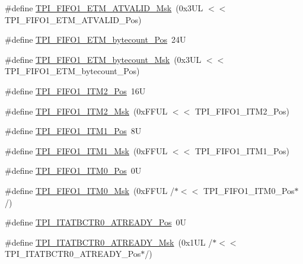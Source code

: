 \begin{DoxyCompactItemize}
\item 
\#define \hyperlink{group___c_m_s_i_s___t_p_i_ga0e8f29a1e9378d1ceb0708035edbb86d}{T\+P\+I\+\_\+\+F\+I\+F\+O1\+\_\+\+E\+T\+M\+\_\+\+A\+T\+V\+A\+L\+I\+D\+\_\+\+Msk}~(0x3\+U\+L $<$$<$ T\+P\+I\+\_\+\+F\+I\+F\+O1\+\_\+\+E\+T\+M\+\_\+\+A\+T\+V\+A\+L\+I\+D\+\_\+\+Pos)
\item 
\#define \hyperlink{group___c_m_s_i_s___t_p_i_gaab31238152b5691af633a7475eaf1f06}{T\+P\+I\+\_\+\+F\+I\+F\+O1\+\_\+\+E\+T\+M\+\_\+bytecount\+\_\+\+Pos}~24U
\item 
\#define \hyperlink{group___c_m_s_i_s___t_p_i_gab554305459953b80554fdb1908b73291}{T\+P\+I\+\_\+\+F\+I\+F\+O1\+\_\+\+E\+T\+M\+\_\+bytecount\+\_\+\+Msk}~(0x3\+U\+L $<$$<$ T\+P\+I\+\_\+\+F\+I\+F\+O1\+\_\+\+E\+T\+M\+\_\+bytecount\+\_\+\+Pos)
\item 
\#define \hyperlink{group___c_m_s_i_s___t_p_i_ga1828c228f3940005f48fb8dd88ada35b}{T\+P\+I\+\_\+\+F\+I\+F\+O1\+\_\+\+I\+T\+M2\+\_\+\+Pos}~16U
\item 
\#define \hyperlink{group___c_m_s_i_s___t_p_i_gae54512f926ebc00f2e056232aa21d335}{T\+P\+I\+\_\+\+F\+I\+F\+O1\+\_\+\+I\+T\+M2\+\_\+\+Msk}~(0x\+F\+F\+U\+L $<$$<$ T\+P\+I\+\_\+\+F\+I\+F\+O1\+\_\+\+I\+T\+M2\+\_\+\+Pos)
\item 
\#define \hyperlink{group___c_m_s_i_s___t_p_i_gaece86ab513bc3d0e0a9dbd82258af49f}{T\+P\+I\+\_\+\+F\+I\+F\+O1\+\_\+\+I\+T\+M1\+\_\+\+Pos}~8U
\item 
\#define \hyperlink{group___c_m_s_i_s___t_p_i_ga3347f42828920dfe56e3130ad319a9e6}{T\+P\+I\+\_\+\+F\+I\+F\+O1\+\_\+\+I\+T\+M1\+\_\+\+Msk}~(0x\+F\+F\+U\+L $<$$<$ T\+P\+I\+\_\+\+F\+I\+F\+O1\+\_\+\+I\+T\+M1\+\_\+\+Pos)
\item 
\#define \hyperlink{group___c_m_s_i_s___t_p_i_ga2188671488417a52abb075bcd4d73440}{T\+P\+I\+\_\+\+F\+I\+F\+O1\+\_\+\+I\+T\+M0\+\_\+\+Pos}~0U
\item 
\#define \hyperlink{group___c_m_s_i_s___t_p_i_ga8ae09f544fc1a428797e2a150f14a4c9}{T\+P\+I\+\_\+\+F\+I\+F\+O1\+\_\+\+I\+T\+M0\+\_\+\+Msk}~(0x\+F\+F\+U\+L /$\ast$$<$$<$ T\+P\+I\+\_\+\+F\+I\+F\+O1\+\_\+\+I\+T\+M0\+\_\+\+Pos$\ast$/)
\item 
\#define \hyperlink{group___c_m_s_i_s___t_p_i_gab1eb6866c65f02fa9c83696b49b0f346}{T\+P\+I\+\_\+\+I\+T\+A\+T\+B\+C\+T\+R0\+\_\+\+A\+T\+R\+E\+A\+D\+Y\+\_\+\+Pos}~0U
\item 
\#define \hyperlink{group___c_m_s_i_s___t_p_i_gaee320b3c60f9575aa96a8742c4ff9356}{T\+P\+I\+\_\+\+I\+T\+A\+T\+B\+C\+T\+R0\+\_\+\+A\+T\+R\+E\+A\+D\+Y\+\_\+\+Msk}~(0x1\+U\+L /$\ast$$<$$<$ T\+P\+I\+\_\+\+I\+T\+A\+T\+B\+C\+T\+R0\+\_\+\+A\+T\+R\+E\+A\+D\+Y\+\_\+\+Pos$\ast$/)

\end{DoxyCompactItemize}
